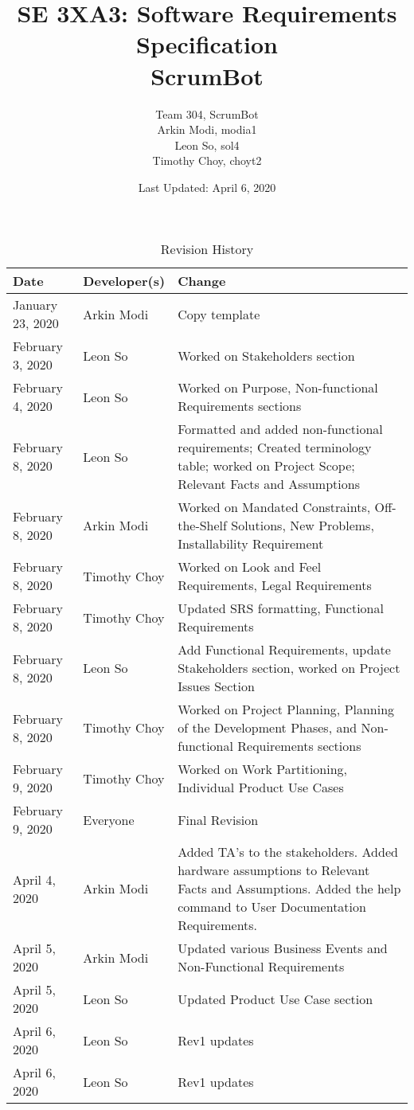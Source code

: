 \documentclass[12pt, titlepage]{article}
\title{SE 3XA3: Software Requirements Specification\\ScrumBot}
\author{
    Team 304, ScrumBot
        \\ Arkin Modi, modia1
        \\ Leon So, sol4
        \\ Timothy Choy, choyt2
}
\date{Last Updated: April 6, 2020}
\begin{document}
\maketitle

\tableofcontents
\listoftables
\listoffigures

\newpage

\begin{table}[!hbp]
    \caption{Revision History} \label{TblRevisionHistory}
    \begin{tabularx}{\textwidth}{llX}
        \toprule
            \textbf{Date} & \textbf{Developer(s)} & \textbf{Change}\\
        \midrule
            January 23, 2020 & Arkin Modi & Copy template\\
            February 3, 2020 & Leon So & Worked on Stakeholders section\\
            February 4, 2020 & Leon So & Worked on Purpose, Non-functional Requirements sections\\
            February 8, 2020 & Leon So & Formatted and added non-functional requirements; Created terminology table; worked on Project Scope; Relevant Facts and Assumptions\\
            February 8, 2020 & Arkin Modi & Worked on Mandated Constraints, Off-the-Shelf Solutions, New Problems, Installability Requirement\\
            February 8, 2020 & Timothy Choy & Worked on Look and Feel Requirements, Legal Requirements\\
            February 8, 2020 & Timothy Choy & Updated SRS formatting, Functional Requirements\\
            February 8, 2020 & Leon So & Add Functional Requirements, update Stakeholders section, worked on Project Issues Section\\
            February 8, 2020 & Timothy Choy & Worked on Project Planning, Planning of the Development Phases, and Non-functional Requirements sections\\
            February 9, 2020 & Timothy Choy & Worked on Work Partitioning, Individual Product Use Cases\\
            February 9, 2020 & Everyone & Final Revision\\
            April 4, 2020 & Arkin Modi & Added TA's to the stakeholders. Added hardware assumptions to Relevant Facts and Assumptions. Added the help command to User Documentation Requirements.\\
            April 5, 2020 & Arkin Modi & Updated various Business Events and Non-Functional Requirements\\
            April 5, 2020 & Leon So & Updated Product Use Case section\\
            April 6, 2020 & Leon So & Rev1 updates\\
            April 6, 2020 & Leon So & Rev1 updates\\
        \bottomrule
    \end{tabularx}
\end{table}
\end{document}
